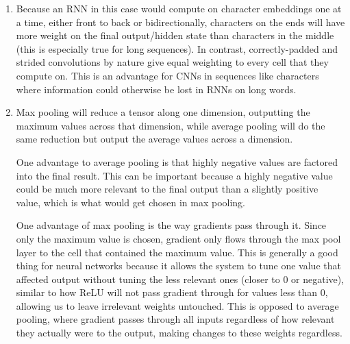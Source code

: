 \documentclass[12pt]{article}
\begin{document}
\begin{enumerate}[label=\alph*{.}]
	\item
		Because an RNN in this case would compute on character embeddings one at a time, either front to back or bidirectionally, characters on the ends will have more weight on the final output/hidden state than characters in the middle (this is especially true for long sequences). In contrast, correctly-padded and strided convolutions by nature give equal weighting to every cell that they compute on. This is an advantage for CNNs in sequences like characters where information could otherwise be lost in RNNs on long words.
	
	\item
		Max pooling will reduce a tensor along one dimension, outputting the maximum values across that dimension, while average pooling will do the same reduction but output the average values across a dimension. 
		
		One advantage to average pooling is that highly negative values are factored into the final result. This can be important because a highly negative value could be much more relevant to the final output than a slightly positive value, which is what would get chosen in max pooling. 
		
		One advantage of max pooling is the way gradients pass through it. Since only the maximum value is chosen, gradient only flows through the max pool layer to the cell that contained the maximum value. This is generally a good thing for neural networks because it allows the system to tune one value that affected output without tuning the less relevant ones (closer to 0 or negative), similar to how ReLU will not pass gradient through for values less than 0, allowing us to leave irrelevant weights untouched. This is opposed to average pooling, where gradient passes through all inputs regardless of how relevant they actually were to the output, making changes to these weights regardless.
		
	\end{enumerate}
\end{document}
